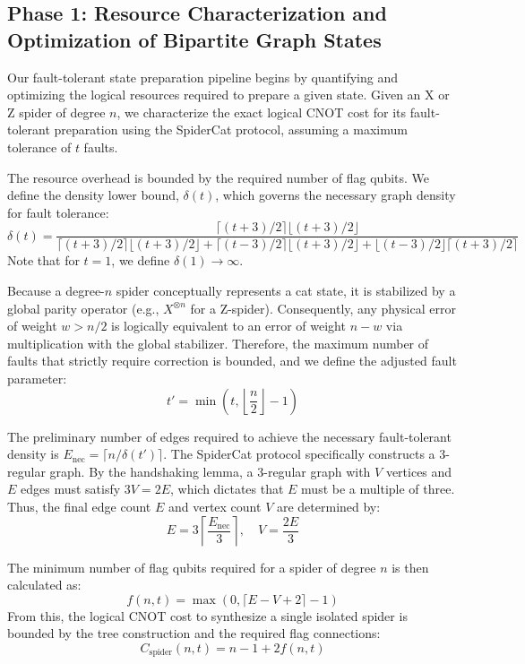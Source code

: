 \documentclass[11pt]{article}
\theoremstyle{definition}
\begin{document}
\subsection{Phase 1: Resource Characterization and Optimization of Bipartite Graph States}

Our fault-tolerant state preparation pipeline begins by quantifying and optimizing the logical resources required to prepare a given state. Given an X or Z spider of degree $n$, we characterize the exact logical CNOT cost for its fault-tolerant preparation using the SpiderCat protocol, assuming a maximum tolerance of $t$ faults.

The resource overhead is bounded by the required number of flag qubits. We define the density lower bound, $\delta(t)$, which governs the necessary graph density for fault tolerance:
\begin{equation}
\delta(t) = \frac{\lceil(t+3)/2\rceil \lfloor(t+3)/2\rfloor}{\lceil(t+3)/2\rceil \lfloor(t+3)/2\rfloor + \lceil(t-3)/2\rceil \lfloor(t+3)/2\rfloor + \lfloor(t-3)/2\rfloor \lceil(t+3)/2\rceil}
\end{equation}
Note that for $t=1$, we define $\delta(1) \to \infty$.

Because a degree-$n$ spider conceptually represents a cat state, it is stabilized by a global parity operator (e.g., $X^{\otimes n}$ for a Z-spider). Consequently, any physical error of weight $w > n/2$ is logically equivalent to an error of weight $n - w$ via multiplication with the global stabilizer. Therefore, the maximum number of faults that strictly require correction is bounded, and we define the adjusted fault parameter:
\begin{equation}
t' = \min\left(t, \left\lfloor \frac{n}{2} \right\rfloor - 1\right)
\end{equation}

The preliminary number of edges required to achieve the necessary fault-tolerant density is $E_{\text{nec}} = \lceil n / \delta(t') \rceil$. The SpiderCat protocol specifically constructs a 3-regular graph. By the handshaking lemma, a 3-regular graph with $V$ vertices and $E$ edges must satisfy $3V = 2E$, which dictates that $E$ must be a multiple of three. Thus, the final edge count $E$ and vertex count $V$ are determined by:
\begin{equation}
E = 3 \left\lceil \frac{E_{\text{nec}}}{3} \right\rceil, \quad V = \frac{2E}{3}
\end{equation}

The minimum number of flag qubits required for a spider of degree $n$ is then calculated as:
\begin{equation}
f(n, t) = \max\left(0, \lceil E - V + 2 \rceil - 1\right)
\end{equation}
From this, the logical CNOT cost to synthesize a single isolated spider is bounded by the tree construction and the required flag connections:
\begin{equation}
C_{\text{spider}}(n, t) = n - 1 + 2f(n, t)
\end{equation}
\end{document}
